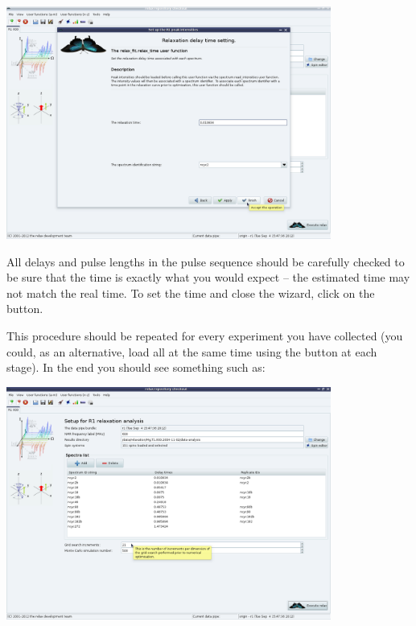 \begin{minipage}[h]{\linewidth}
\centerline{\includegraphics[width=0.8\textwidth, bb=14 14 1415 1019]{graphics/screenshots/r1_analysis/peak_intensity_times}}
\end{minipage}

All delays and pulse lengths in the pulse sequence should be carefully checked to be sure that the time is exactly what you would expect -- the estimated time may not match the real time.  To set the time and close the wizard, click on the  button.

This procedure should be repeated for every experiment you have collected (you could, as an alternative, load all at the same time using the  button at each stage).  In the end you should see something such as:

\begin{minipage}[h]{\linewidth}
\centerline{\includegraphics[width=0.8\textwidth, bb=14 14 1415 1019]{graphics/screenshots/r1_analysis/analysis_tab_full}}
\end{minipage}


